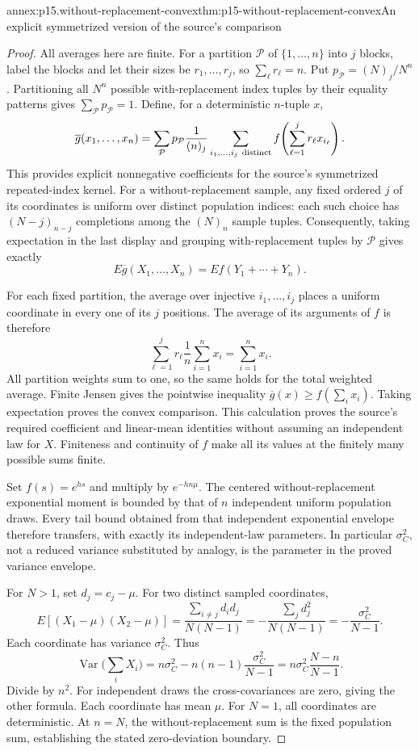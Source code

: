 \begin{annexitem}{annex:p15.without-replacement-convex}{thm:p15-without-replacement-convex}{An explicit symmetrized version of the source's comparison}
\begin{proof}
All averages here are finite. For a partition \(\mathcal P\) of
\(\{1,\ldots,n\}\) into \(j\) blocks, label the blocks and let their
sizes be \(r_1,\ldots,r_j\), so \(\sum_\ell r_\ell=n\).
Put \(p_{\mathcal P}=(N)_j/N^n\). Partitioning all \(N^n\) possible
with-replacement index tuples by their equality patterns gives
\(\sum_{\mathcal P}p_{\mathcal P}=1\).
Define, for a deterministic \(n\)-tuple \(x\),
\[
 \overline g(x_1,\ldots,x_n)=
 \sum_{\mathcal P}p_{\mathcal P}\frac1{(n)_j}
 \sum_{i_1,\ldots,i_j\ {\rm distinct}}
 f\!\left(\sum_{\ell=1}^j r_\ell x_{i_\ell}\right).
\]
This provides explicit nonnegative coefficients for the source's
symmetrized repeated-index kernel. For a without-replacement sample,
any fixed ordered \(j\) of its coordinates is uniform over distinct
population indices: each such choice has \((N-j)_{n-j}\) completions
among the \((N)_n\) sample tuples.
Consequently, taking expectation in the last display and grouping
with-replacement tuples by \(\mathcal P\) gives exactly
\[
 E\overline g(X_1,\ldots,X_n)=E f(Y_1+\cdots+Y_n).
\]

For each fixed partition, the average over injective \(i_1,\ldots,i_j\)
places a uniform coordinate in every one of its \(j\) positions.
The average of its arguments of \(f\) is therefore
\[
 \sum_{\ell=1}^j r_\ell\frac1n\sum_{i=1}^nx_i
 =\sum_{i=1}^nx_i.
\]
All partition weights sum to one, so the same holds for the total
weighted average. Finite Jensen gives the pointwise inequality
\(\overline g(x)\geq f(\sum_i x_i)\).
Taking expectation proves the convex comparison.
This calculation proves the source's required coefficient and
linear-mean identities without assuming an independent law for \(X\).
Finiteness and continuity of \(f\) make all its values at the finitely
many possible sums finite.

Set \(f(s)=e^{hs}\) and multiply by \(e^{-hn\mu}\).
The centered without-replacement exponential moment is bounded by
that of \(n\) independent uniform population draws. Every tail
bound obtained from that independent exponential envelope therefore
transfers, with exactly its independent-law parameters.
In particular \(\sigma_C^2\), not a reduced variance substituted by
analogy, is the parameter in the proved variance envelope.

For \(N>1\), set \(d_j=c_j-\mu\). For two distinct sampled coordinates,
\[
 E[(X_1-\mu)(X_2-\mu)]
 =\frac{\sum_{i\ne j}d_id_j}{N(N-1)}
 =-\frac{\sum_jd_j^2}{N(N-1)}
 =-\frac{\sigma_C^2}{N-1}.
\]
Each coordinate has variance \(\sigma_C^2\). Thus
\[
 \operatorname{Var}\Big(\sum_iX_i\Big)
 =n\sigma_C^2-n(n-1)\frac{\sigma_C^2}{N-1}
 =n\sigma_C^2\frac{N-n}{N-1}.
\]
Divide by \(n^2\). For independent draws the cross-covariances are
zero, giving the other formula. Each coordinate has mean \(\mu\).
For \(N=1\), all coordinates are deterministic.
At \(n=N\), the without-replacement sum is the fixed population sum,
establishing the stated zero-deviation boundary.
\end{proof}
\end{annexitem}

